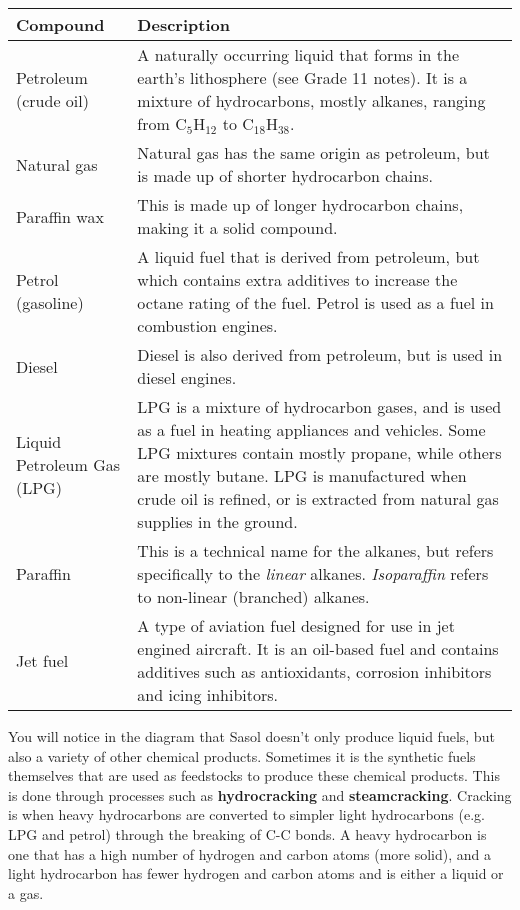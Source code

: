 \begin{enumerate}
\begin{center}
\begin{tabular}{|p{2.5cm}|p{7.5cm}|}\hline
\textbf{Compound} & \textbf{Description} \\\hline
Petroleum (crude oil) & A naturally occurring liquid that forms in the earth's lithosphere (see Grade 11 notes). It is a mixture of hydrocarbons, mostly alkanes, ranging from C$_{5}$H$_{12}$ to C$_{18}$H$_{38}$. \\\hline
Natural gas & Natural gas has the same origin as petroleum, but is made up of shorter hydrocarbon chains.\\\hline
Paraffin wax & This is made up of longer hydrocarbon chains, making it a solid compound.\\\hline
Petrol (gasoline) & A liquid fuel that is derived from petroleum, but which contains extra additives to increase the octane rating of the fuel. Petrol is used as a fuel in combustion engines.\\\hline
Diesel & Diesel is also derived from petroleum, but is used in diesel engines.\\\hline
Liquid Petroleum Gas (LPG) & LPG is a mixture of hydrocarbon gases, and is used as a fuel in heating appliances and vehicles. Some LPG mixtures contain mostly propane, while others are mostly butane. LPG is manufactured when crude oil is refined, or is extracted from natural gas supplies in the ground.\\\hline
Paraffin & This is a technical name for the alkanes, but refers specifically to the \textit{linear} alkanes. \textit{Isoparaffin} refers to non-linear (branched) alkanes.\\\hline
Jet fuel & A type of aviation fuel designed for use in jet engined aircraft. It is an oil-based fuel and contains additives such as antioxidants, corrosion inhibitors and icing inhibitors.\\\hline
\end{tabular}
\end{center}


You will notice in the diagram that Sasol doesn't only produce liquid fuels, but also a variety of other chemical products. Sometimes it is the synthetic fuels themselves that are used as feedstocks to produce these chemical products. This is done through processes such as \textbf{hydrocracking} and \textbf{steamcracking}. Cracking is when heavy hydrocarbons are converted to simpler light hydrocarbons (e.g. LPG and petrol) through the breaking of C-C bonds. A heavy hydrocarbon is one that has a high number of hydrogen and carbon atoms (more solid), and a light hydrocarbon has fewer hydrogen and carbon atoms and is either a liquid or a gas.\\


\end{enumerate}
